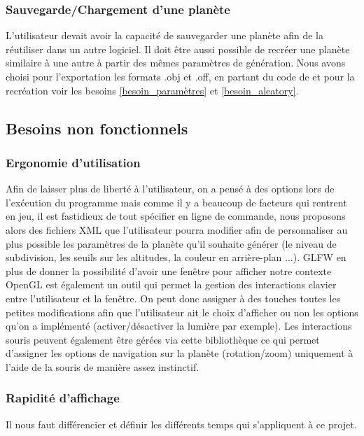 \documentclass[a4paper]{article}
\begin{document}
\subsubsection{Sauvegarde/Chargement d'une planète}

L’utilisateur devait avoir la capacité de sauvegarder une planète afin de la réutiliser dans un autre logiciel. Il doit être aussi possible de recréer une planète similaire à une autre à partir des mêmes paramètres de génération. Nous avons choisi pour l'exportation les formats .obj et .off, en partant du code de \cite{TD_3D} et pour la recréation voir les besoins \ref{besoin_paramètres} et \ref{besoin_aleatory}.

\subsection{Besoins non fonctionnels}


\subsubsection{Ergonomie d'utilisation}
Afin de laisser plus de liberté à l'utilisateur, on a pensé à des options lors de l'exécution du programme mais comme il y a beaucoup de facteurs qui rentrent en jeu, il est fastidieux de tout spécifier en ligne de commande, nous proposons alors des fichiers XML que l'utilisateur pourra modifier afin de personnaliser au plus possible les paramètres de la planète qu'il souhaite générer (le niveau de subdivision, les seuils sur les altitudes, la couleur en arrière-plan ...).
GLFW en plus de donner la possibilité d'avoir une fenêtre pour afficher notre contexte OpenGL est également un outil qui permet  la gestion des interactions clavier entre l'utilisateur et la fenêtre. On peut donc assigner à des touches toutes les petites modifications afin que l'utilisateur ait le choix d'afficher ou non les options qu'on a implémenté (activer/désactiver la lumière par exemple). Les interactions souris peuvent également être gérées via cette bibliothèque ce qui permet d'assigner les options de navigation sur la planète (rotation/zoom) uniquement à l'aide de la souris de manière assez instinctif.

\subsubsection{Rapidité d'affichage}
Il nous faut différencier et définir les différents temps qui s'appliquent à ce projet. \\
\end{document}
